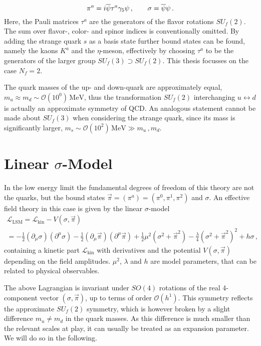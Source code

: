 \begin{equation}
    \pi^a={i}\overline{\psi}\tau^a\gamma_5\psi\,,\qquad\sigma=\overline{\psi}\psi\,.
\end{equation}
Here, the Pauli matrices $\tau^a$ are the generators of the flavor rotations $SU_f(2)$. The sum over flavor-, color- and spinor indices is conventionally omitted. By adding the strange quark $s$ as a basis state further bound states can be found, namely the kaons $K^a$ and the $\eta$-meson, effectively by choosing $\tau^a$ to be the generators of the larger group ${SU_f(3)\supset SU_f(2)}$. This thesis focusses on the case ${N_f=2}$.

The quark masses of the up- and down-quark are approximately equal, ${m_u\approx m_d\sim\mathcal{O}(10^0)\,\mathrm{MeV}}$, thus the transformation $SU_f(2)$ interchanging ${u\leftrightarrow d}$ is actually an approximate symmetry of QCD. An analogous statement cannot be made about $SU_f(3)$ when considering the strange quark, since its mass is significantly larger, ${m_s\sim\mathcal{O}(10^2)\,\mathrm{MeV}\gg m_u\,,m_d}$.








\section{Linear $\sigma$-Model}

In the low energy limit the fundamental degrees of freedom of this theory are not the quarks, but the bound states $\vec{\pi}=(\pi^a)=(\pi^0,\pi^1,\pi^2)$ and $\sigma$. An effective field theory in this case is given by the linear $\sigma$-model
\begin{multline}
    \mathscr{L}_{\text{LSM}}=\mathscr{L}_{\text{kin}}-V(\sigma,\vec{\pi})\\
    =-\frac{1}{2}(\partial_\mu\sigma)(\partial^\mu\sigma)-\frac{1}{2}(\partial_\mu\vec{\pi})(\partial^\mu\vec{\pi})
    +\frac{1}{2}\mu^2(\sigma^2+\vec{\pi}^2)-\frac{\lambda}{4}(\sigma^2+\vec{\pi}^2)^2+h\sigma\,,
    \label{eq:LinearSigmaModelLagrangian}
\end{multline}
containing a kinetic part $\mathscr{L}_{\text{kin}}$ with derivatives and the potential $V(\sigma,\vec{\pi})$ depending on the field amplitudes. $\mu^2$, $\lambda$ and $h$ are model parameters, that can be related to physical observables.

The above Lagrangian is invariant under $SO(4)$ rotations of the real 4-component vector ${(\sigma,\vec{\pi})}$, up to terms of order ${\mathcal{O}(h^1)}$. This symmetry reflects the approximate $SU_f(2)$ symmetry, which is however broken by a slight difference ${m_u\neq m_d}$ in the quark masses. As this difference is much smaller than the relevant scales at play, it can usually be treated as an expansion parameter. We will do so in the following.

